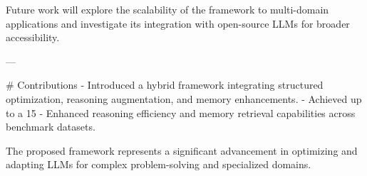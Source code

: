 Future work will explore the scalability of the framework to multi-domain applications and investigate its integration with open-source LLMs for broader accessibility.  

---

# Contributions  
- Introduced a hybrid framework integrating structured optimization, reasoning augmentation, and memory enhancements.  
- Achieved up to a 15%
- Enhanced reasoning efficiency and memory retrieval capabilities across benchmark datasets.  

The proposed framework represents a significant advancement in optimizing and adapting LLMs for complex problem-solving and specialized domains.  